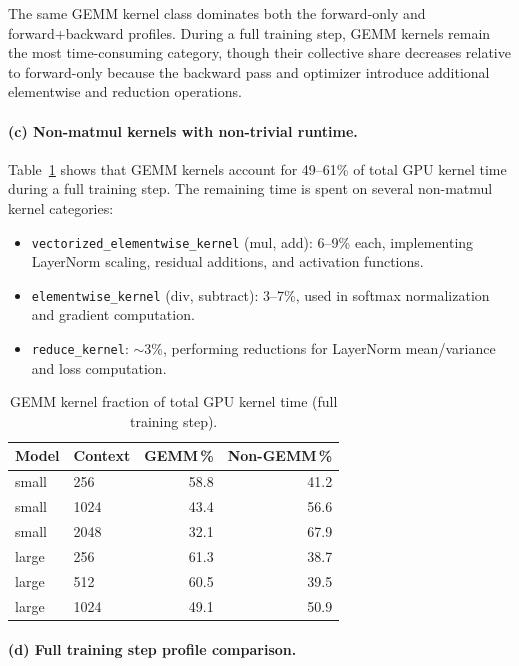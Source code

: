 \documentclass[11pt]{article}
\begin{document}
The same GEMM kernel class dominates both the forward-only and
forward+backward profiles.
During a full training step, GEMM kernels remain the most time-consuming
category, though their collective share decreases relative to forward-only
because the backward pass and optimizer introduce additional elementwise
and reduction operations.

\paragraph{(c) Non-matmul kernels with non-trivial runtime.}

Table~\ref{tab:nsys-gemm-frac} shows that GEMM kernels account for
49--61\% of total GPU kernel time during a full training step.
The remaining time is spent on several non-matmul kernel categories:

\begin{itemize}[nosep]
  \item \texttt{vectorized\_elementwise\_kernel} (mul, add): 6--9\% each,
    implementing LayerNorm scaling, residual additions, and activation functions.
  \item \texttt{elementwise\_kernel} (div, subtract): 3--7\%,
    used in softmax normalization and gradient computation.
  \item \texttt{reduce\_kernel}: $\sim$3\%, performing reductions
    for LayerNorm mean/variance and loss computation.
\end{itemize}

\begin{table}[H]
\centering
\caption{GEMM kernel fraction of total GPU kernel time (full training step).}
\label{tab:nsys-gemm-frac}
\begin{tabular}{llrr}
  \toprule
  Model & Context & GEMM\,\% & Non-GEMM\,\% \\
  \midrule
  small & 256  & 58.8 & 41.2 \\
  small & 1024 & 43.4 & 56.6 \\
  small & 2048 & 32.1 & 67.9 \\
  \midrule
  large & 256  & 61.3 & 38.7 \\
  large & 512  & 60.5 & 39.5 \\
  large & 1024 & 49.1 & 50.9 \\
  \bottomrule
\end{tabular}
\end{table}

\paragraph{(d) Full training step profile comparison.}
\end{document}

